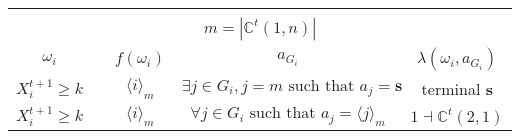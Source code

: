 \documentclass[12pt,letter]{article}
\newcommand{\Kappa}{\mathbb{C}}
\theoremstyle{definition}
\theoremstyle{remark}
\theoremstyle{claim}
\begin{document}
\begin{table}[!htbp]
\begin{center}
\begin{tabular}{c c | c | c | c}
\hline
\\
\multicolumn{5}{c}{$m= |\Kappa^t(1,n)|$}\\
$\omega_i$ 	 & 	   &	$f(\omega_i)$  &	$a_{G_i}$ & $\lambda(\omega_i,a_{G_i})$ \\
\hline
\hline
$X^{t+1}_i\geq k$ 	& 						& $\langle i \rangle_m$		&  $\exists j\in G_i, j=m\text{ such that } a_j=\textbf{s}$	& terminal \textbf{s}\\
$X^{t+1}_i\geq k$ 	& 						& $\langle i \rangle_m$		&  $\forall j\in G_i\text{ such that } a_j= \langle j \rangle_m$	& $1\dashv \Kappa^t(2,1)$\\
\hline
\end{tabular}
\end{center}
\end{table}


\clearpage
\end{document}
